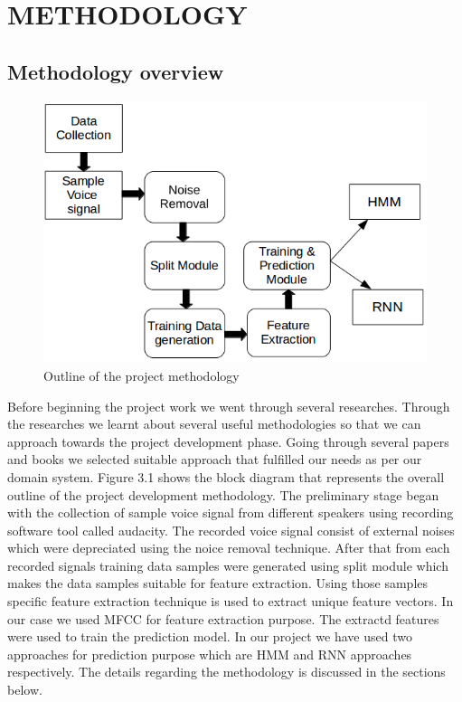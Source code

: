

\section{METHODOLOGY}


\subsection{Methodology overview}

\begin{figure}[h]
	\begin{center}
		\includegraphics[scale=0.8]{images/methodology.png}
		\caption{Outline of the project methodology }
		\label{methodology}
	\end{center}
\end{figure}

Before beginning the project work we went through several researches. Through the researches we learnt about several useful methodologies so that we can approach towards the project development phase. Going through several papers and books we selected suitable approach that fulfilled our needs as per our domain system. Figure 3.1 shows the block diagram that represents the overall outline of the project development methodology. The preliminary stage began with the collection of sample voice signal from different speakers using recording software tool called audacity. The recorded voice signal consist of external noises which were depreciated using the noice removal technique. After that from each recorded signals training data samples were generated using split module which makes the data samples suitable for feature extraction. Using those samples specific feature extraction technique is used to extract unique feature vectors. In our case we used MFCC for feature extraction purpose. The extractd features were used to train the prediction model. In our project we have used two approaches for prediction purpose which are HMM and RNN approaches respectively. The details regarding the methodology is discussed in the sections below.



